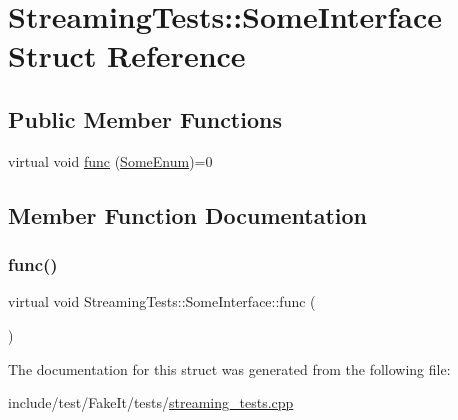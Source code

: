 \hypertarget{structStreamingTests_1_1SomeInterface}{}\section{Streaming\+Tests\+::Some\+Interface Struct Reference}
\label{structStreamingTests_1_1SomeInterface}
\subsection*{Public Member Functions}
\begin{DoxyCompactItemize}
\item 
virtual void \mbox{\hyperlink{structStreamingTests_1_1SomeInterface_a57bc22b0f0ec68151314cd45b0e7ca85}{func}} (\mbox{\hyperlink{structStreamingTests_a52e6d080d76d5c4fcdaed3eecc52ae39}{Some\+Enum}})=0
\end{DoxyCompactItemize}


\subsection{Member Function Documentation}
\mbox{\label{structStreamingTests_1_1SomeInterface_a57bc22b0f0ec68151314cd45b0e7ca85}} 
\subsubsection{\texorpdfstring{func()}{func()}}
{\footnotesize\ttfamily virtual void Streaming\+Tests\+::\+Some\+Interface\+::func (\begin{DoxyParamCaption}\item[{\mbox{\hyperlink{structStreamingTests_a52e6d080d76d5c4fcdaed3eecc52ae39}{Some\+Enum}}}]{ }\end{DoxyParamCaption})\hspace{0.3cm}{\ttfamily [pure virtual]}}



The documentation for this struct was generated from the following file\+:\begin{DoxyCompactItemize}
\item 
include/test/\+Fake\+It/tests/\mbox{\hyperlink{streaming__tests_8cpp}{streaming\+\_\+tests.\+cpp}}\end{DoxyCompactItemize}
